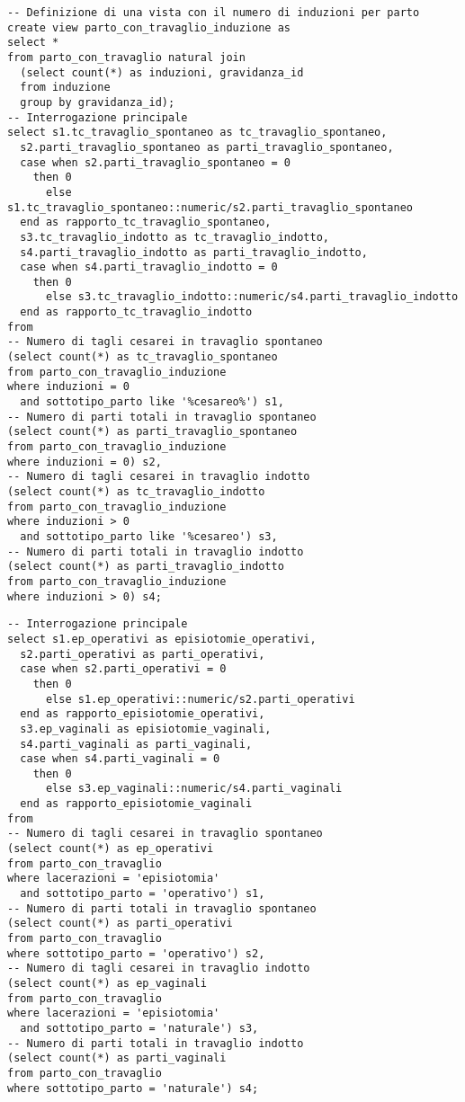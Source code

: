 \begin{lstlisting}[float,caption={Esempio di interrogazione. Correlazione tra parto cesareo e travaglio indotto.},label=qcesareotravaglio]
-- Definizione di una vista con il numero di induzioni per parto
create view parto_con_travaglio_induzione as
select *
from parto_con_travaglio natural join
  (select count(*) as induzioni, gravidanza_id
  from induzione
  group by gravidanza_id);
-- Interrogazione principale
select s1.tc_travaglio_spontaneo as tc_travaglio_spontaneo,
  s2.parti_travaglio_spontaneo as parti_travaglio_spontaneo,
  case when s2.parti_travaglio_spontaneo = 0
    then 0
	  else s1.tc_travaglio_spontaneo::numeric/s2.parti_travaglio_spontaneo
  end as rapporto_tc_travaglio_spontaneo,
  s3.tc_travaglio_indotto as tc_travaglio_indotto,
  s4.parti_travaglio_indotto as parti_travaglio_indotto,
  case when s4.parti_travaglio_indotto = 0
    then 0
	  else s3.tc_travaglio_indotto::numeric/s4.parti_travaglio_indotto
  end as rapporto_tc_travaglio_indotto
from
-- Numero di tagli cesarei in travaglio spontaneo
(select count(*) as tc_travaglio_spontaneo
from parto_con_travaglio_induzione
where induzioni = 0
  and sottotipo_parto like '%cesareo%') s1,
-- Numero di parti totali in travaglio spontaneo
(select count(*) as parti_travaglio_spontaneo
from parto_con_travaglio_induzione
where induzioni = 0) s2,
-- Numero di tagli cesarei in travaglio indotto
(select count(*) as tc_travaglio_indotto
from parto_con_travaglio_induzione
where induzioni > 0
  and sottotipo_parto like '%cesareo') s3,
-- Numero di parti totali in travaglio indotto
(select count(*) as parti_travaglio_indotto
from parto_con_travaglio_induzione
where induzioni > 0) s4;
\end{lstlisting}

\begin{lstlisting}[float,caption={Esempio di interrogazione. Correlazione tra parto operativo ed episiotomia.},label=qoperativoepisiotomia]
-- Interrogazione principale
select s1.ep_operativi as episiotomie_operativi,
  s2.parti_operativi as parti_operativi,
  case when s2.parti_operativi = 0
    then 0
	  else s1.ep_operativi::numeric/s2.parti_operativi
  end as rapporto_episiotomie_operativi,
  s3.ep_vaginali as episiotomie_vaginali,
  s4.parti_vaginali as parti_vaginali,
  case when s4.parti_vaginali = 0
    then 0
	  else s3.ep_vaginali::numeric/s4.parti_vaginali
  end as rapporto_episiotomie_vaginali
from
-- Numero di tagli cesarei in travaglio spontaneo
(select count(*) as ep_operativi
from parto_con_travaglio
where lacerazioni = 'episiotomia'
  and sottotipo_parto = 'operativo') s1,
-- Numero di parti totali in travaglio spontaneo
(select count(*) as parti_operativi
from parto_con_travaglio
where sottotipo_parto = 'operativo') s2,
-- Numero di tagli cesarei in travaglio indotto
(select count(*) as ep_vaginali
from parto_con_travaglio
where lacerazioni = 'episiotomia'
  and sottotipo_parto = 'naturale') s3,
-- Numero di parti totali in travaglio indotto
(select count(*) as parti_vaginali
from parto_con_travaglio
where sottotipo_parto = 'naturale') s4;
\end{lstlisting}

